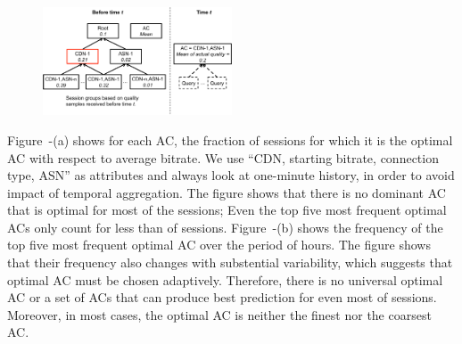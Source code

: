 \begin{figure}[h!]
\centering
 \includegraphics[width=0.5\textwidth] {figures/fig-optimal-AC.pdf}
\label{fig:example-optimal-ac}
\end{figure}

Figure~\fillme-(a) shows for each AC, the fraction of sessions for which it is the optimal AC with respect to average bitrate. We use ``CDN, starting bitrate, connection type, ASN'' as attributes and always look at one-minute history, in order to avoid impact of temporal aggregation. The figure shows that there is no dominant AC that is optimal for most of the sessions; Even the top five most frequent optimal ACs only count for less than \fillme of sessions. Figure~\fillme-(b) shows the frequency of the top five most frequent optimal AC over the period of \fillme hours. The figure shows that their frequency also changes with substential variability, which suggests that optimal AC must be chosen adaptively.
Therefore, there is no universal optimal AC or a set of ACs that can produce best prediction for even most of sessions. Moreover, in most cases, the optimal AC is neither the finest nor the coarsest AC.



